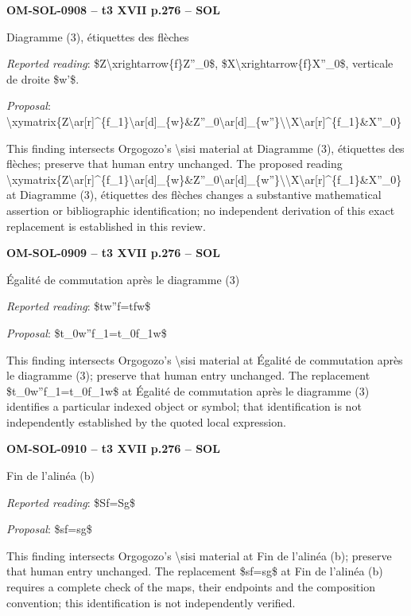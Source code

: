 \par\noindent\textbf{OM-SOL-0908 -- t3 XVII p.276 -- SOL}\par
Diagramme (3), étiquettes des flèches\par
\emph{Reported reading}: \$Z\textbackslash{}xrightarrow\{f\}Z''\_0\$, \$X\textbackslash{}xrightarrow\{f\}X''\_0\$, verticale de droite \$w'\$.\par
\emph{Proposal}: \textbackslash{}xymatrix\{Z\textbackslash{}ar[r]\textasciicircum{}\{f\_1\}\textbackslash{}ar[d]\_\{w\}\&Z''\_0\textbackslash{}ar[d]\_\{w''\}\textbackslash{}\textbackslash{}X\textbackslash{}ar[r]\textasciicircum{}\{f\_1\}\&X''\_0\}\par
This finding intersects Orgogozo's \textbackslash{}sisi material at Diagramme (3), étiquettes des flèches; preserve that human entry unchanged. The proposed reading \textbackslash{}xymatrix\{Z\textbackslash{}ar[r]\textasciicircum{}\{f\_1\}\textbackslash{}ar[d]\_\{w\}\&Z''\_0\textbackslash{}ar[d]\_\{w''\}\textbackslash{}\textbackslash{}X\textbackslash{}ar[r]\textasciicircum{}\{f\_1\}\&X''\_0\} at Diagramme (3), étiquettes des flèches changes a substantive mathematical assertion or bibliographic identification; no independent derivation of this exact replacement is established in this review.\par
\par\noindent\textbf{OM-SOL-0909 -- t3 XVII p.276 -- SOL}\par
Égalité de commutation après le diagramme (3)\par
\emph{Reported reading}: \$tw''f=\allowbreak tfw\$\par
\emph{Proposal}: \$t\_0w''f\_1=\allowbreak t\_0f\_1w\$\par
This finding intersects Orgogozo's \textbackslash{}sisi material at Égalité de commutation après le diagramme (3); preserve that human entry unchanged. The replacement \$t\_0w''f\_1=\allowbreak t\_0f\_1w\$ at Égalité de commutation après le diagramme (3) identifies a particular indexed object or symbol; that identification is not independently established by the quoted local expression.\par
\par\noindent\textbf{OM-SOL-0910 -- t3 XVII p.276 -- SOL}\par
Fin de l'alinéa (b)\par
\emph{Reported reading}: \$Sf=\allowbreak Sg\$\par
\emph{Proposal}: \$sf=\allowbreak sg\$\par
This finding intersects Orgogozo's \textbackslash{}sisi material at Fin de l'alinéa (b); preserve that human entry unchanged. The replacement \$sf=\allowbreak sg\$ at Fin de l'alinéa (b) requires a complete check of the maps, their endpoints and the composition convention; this identification is not independently verified.\par
